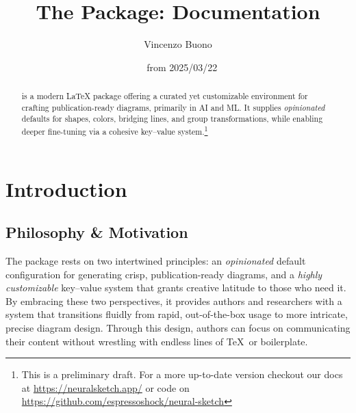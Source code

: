 \documentclass[show-experimental]{l3doc}
\title{The \pkg{neural-sketch} Package: Documentation}
\author{Vincenzo Buono}
\date{\fileversion~ from 2025/03/22}
\begin{document}
\maketitle
\tableofcontents

\begin{abstract}
	\noindent
	 is a modern \LaTeX{} package offering
	a curated yet customizable environment for crafting publication-ready
	diagrams, primarily in AI and ML. It supplies
	\emph{opinionated} defaults for shapes, colors, bridging lines, and
	group transformations, while enabling deeper fine-tuning via a cohesive
  key--value system.\footnote{This is a preliminary draft. For a more up-to-date version checkout our docs at \href{https://neuralsketch.app/}{https://neuralsketch.app/} or code on \href{https://github.com/espressoshock/neural-sketch}{https://github.com/espressoshock/neural-sketch}}
\end{abstract}


\section{Introduction}

\subsection{Philosophy \& Motivation}

The  package rests on two intertwined principles: an \emph{opinionated} default configuration for generating crisp, publication-ready diagrams, and a \emph{highly customizable} key–value system that grants creative latitude to those who need it. By embracing these two perspectives, it provides authors and researchers with a system that transitions fluidly from rapid, out-of-the-box usage to more intricate, precise diagram design. Through this design, authors can focus on communicating their content without wrestling with endless lines of \TeX\ or  boilerplate.

\end{document}
